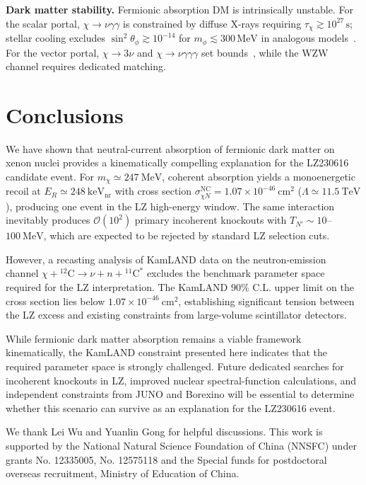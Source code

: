 \documentclass[aps,twocolumn,superscriptaddress,groupedaddress,nofootinbib,floatfix]{revtex4}
\newcommand{\MeV}{\,\mathrm{MeV}}
\newcommand{\s}{\,\mathrm{s}}
\begin{document}
\textbf{Dark matter stability.} Fermionic absorption DM is intrinsically unstable. For the scalar portal, $\chi\to\nu\gamma\gamma$ is constrained by diffuse X-rays requiring $\tau_\chi\gtrsim10^{27}\s$; stellar cooling excludes $\sin^2\theta_\phi\gtrsim10^{-14}$ for $m_\phi\lesssim300\MeV$ in analogous models~\cite{Cox:2023cjw}. For the vector portal, $\chi\to3\nu$ and $\chi\to\nu\gamma\gamma\gamma$ set bounds~\cite{Dror:2019dib}, while the WZW channel requires dedicated matching. 


\section{Conclusions}
\label{sec:conclusions}

We have shown that neutral-current absorption of fermionic dark matter on xenon nuclei provides a kinematically compelling explanation for the LZ230616 candidate event. For $m_\chi \simeq 247\ \mathrm{MeV}$, coherent absorption yields a monoenergetic recoil at $E_R \simeq 248\ \mathrm{keV}_{\mathrm{nr}}$ with cross section $\sigma_{\chi N}^{\mathrm{NC}} = 1.07\times10^{-46}\ \mathrm{cm}^2$ ($\Lambda \simeq 11.5\ \mathrm{TeV}$), producing one event in the LZ high-energy window. The same interaction inevitably produces $\mathcal{O}(10^2)$ primary incoherent knockouts with $T_{N'} \sim 10$--$100\ \mathrm{MeV}$, which are expected to be rejected by standard LZ selection cuts.

However, a recasting analysis of KamLAND data on the neutron-emission channel $\chi+{}^{12}\mathrm{C} \to \nu + n + {}^{11}\mathrm{C}^*$ excludes the benchmark parameter space required for the LZ interpretation. The KamLAND $90\%$ C.L. upper limit on the cross section lies below $1.07\times10^{-46}\ \mathrm{cm}^2$, establishing significant tension between the LZ excess and existing constraints from large-volume scintillator detectors.

While fermionic dark matter absorption remains a viable framework kinematically, the KamLAND constraint presented here indicates that the required parameter space is strongly challenged. Future dedicated searches for incoherent knockouts in LZ, improved nuclear spectral-function calculations, and independent constraints from JUNO and Borexino will be essential to determine whether this scenario can survive as an explanation for the LZ230616 event.


\begin{acknowledgments}
We thank Lei Wu and Yuanlin Gong for helpful discussions. This work is supported by the National Natural Science Foundation of China (NNSFC) under grants No. 12335005, No. 12575118 and the Special funds for postdoctoral overseas recruitment, Ministry of Education of China.
\end{acknowledgments}
\end{document}
